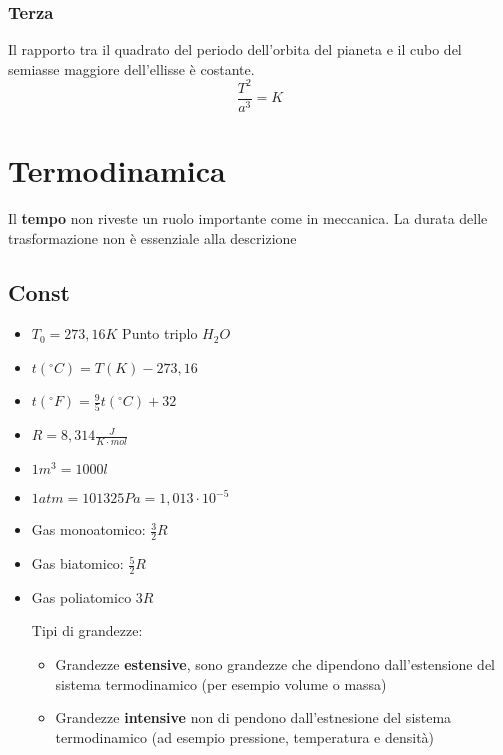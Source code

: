 \documentclass[a4paper]{report}
\begin{document}
  \subsection{Terza}
  Il rapporto tra il quadrato del periodo dell'orbita del pianeta e il cubo del semiasse maggiore dell'ellisse è costante.
  $$ \frac{T^2}{a^3} = K $$





  \chapter{Termodinamica}
  Il \textbf{tempo} non riveste un ruolo importante come in meccanica. La durata delle trasformazione non è essenziale alla descrizione

  \section{Const}
  \begin{itemize}
    \item $T_0 = 273,16 K$ Punto triplo $H_2O$
    \item $t(^\circ  C)= T(K) - 273,16$
    \item $t(^\circ  F)= \frac{9}{5} t(^\circ  C) + 32$
    \item $R = 8,314 \frac{J}{K \cdot mol}$
    \item $1 m^3 = 1000l$
    \item $1 atm = 101325Pa = 1,013 \cdot 10^{-5}$
    \item Gas monoatomico: $\frac{3}{2}R$
    \item Gas biatomico: $\frac{5}{2}R$
    \item Gas poliatomico $3 R$

    Tipi di grandezze:
    \begin{itemize}
      \item Grandezze \textbf{estensive}, sono grandezze che dipendono dall'estensione del sistema termodinamico (per esempio volume o massa)
      \item Grandezze \textbf{intensive} non di pendono dall'estnesione del sistema termodinamico (ad esempio pressione, temperatura e densità)
    \end{itemize}
  \end{itemize}
\end{document}

